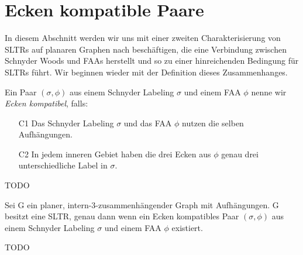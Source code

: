 \section{Ecken kompatible Paare}

In diesem Abschnitt werden wir uns mit einer zweiten Charakterisierung von SLTRs auf planaren Graphen nach \cite{af15} beschäftigen, die eine Verbindung zwischen Schnyder Woods und FAAs herstellt und so zu einer hinreichenden Bedingung für SLTRs führt. Wir beginnen wieder mit der Definition dieses Zusammenhanges.

\begin{definition}\label{def_coco}
Ein Paar $(\sigma,\phi)$ aus einem Schnyder Labeling $\sigma$ und einem FAA $\phi$ nenne wir \textit{Ecken kompatibel}, falls:
\begin{itemize}
\item [C1] Das Schnyder Labeling $\sigma$ und das FAA $\phi$ nutzen die selben Aufhängungen.
\item [C2] In jedem inneren Gebiet haben die drei Ecken aus $\phi$ genau drei unterschiedliche Label in $\sigma$.
\end{itemize}
\end{definition}

TODO

\begin{theorem}\label{theo_coco}
Sei G ein planer, intern-3-zusammenhängender Graph mit Aufhängungen. G besitzt eine SLTR, genau dann wenn ein Ecken kompatibles Paar $(\sigma,\phi)$ aus einem Schnyder Labeling $\sigma$ und einem FAA $\phi$ existiert.
\end{theorem}

TODO